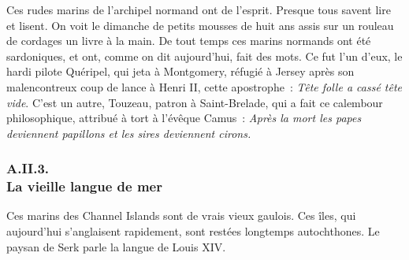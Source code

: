 \documentclass[french,twoside]{book} %
\begin{document}
Ces rudes marins de l’archipel normand ont de  l’esprit. Presque tous savent lire et lisent. On voit le dimanche de petits mousses de huit ans assis sur un rouleau de cordages un livre à la main. De tout temps ces marins normands ont été sardoniques, et ont, comme on dit aujourd’hui, fait des mots. Ce fut l’un d’eux, le hardi pilote Quéripel, qui jeta à Montgomery, réfugié à Jersey après son malencontreux coup de lance à Henri II, cette apostrophe : \emph{Tête folle a cassé tête vide}. C’est un autre, Touzeau, patron à Saint-Brelade, qui a fait ce calembour philosophique, attribué à tort à l’évêque Camus : \emph{Après la mort les papes deviennent papillons et les sires deviennent cirons.}
 \subsubsection[{A.II.3. La vieille langue de mer}]{A.II.3. \\
La vieille langue de mer}
\noindent Ces marins des Channel Islands sont de vrais vieux gaulois. Ces îles, qui aujourd’hui s’anglaisent rapidement, sont restées longtemps autochthones. Le paysan de Serk parle la langue de Louis XIV.\par
\end{document}

